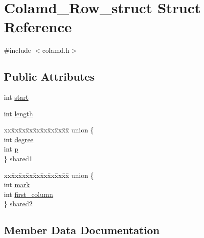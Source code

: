 \hypertarget{structColamd__Row__struct}{}\section{Colamd\+\_\+\+Row\+\_\+struct Struct Reference}
\label{structColamd__Row__struct}


{\ttfamily \#include $<$colamd.\+h$>$}

\subsection*{Public Attributes}
\begin{DoxyCompactItemize}
\item 
int \hyperlink{structColamd__Row__struct_a24285056395b1cf2e28ea3810d67d09d}{start}
\item 
int \hyperlink{structColamd__Row__struct_a4cf6076c6aeab980aa2add1c24913c35}{length}
\item 
\begin{tabbing}
xx\=xx\=xx\=xx\=xx\=xx\=xx\=xx\=xx\=\kill
union \{\\
\>int \hyperlink{structColamd__Row__struct_a01e336d70f1cbe2ac615d4b23c480ecd}{degree}\\
\>int \hyperlink{structColamd__Row__struct_acb0d165350cbbdad8dc4260bd48b1f80}{p}\\
\} \hyperlink{structColamd__Row__struct_a9f8a228dc157733ece95870aa59b14c0}{shared1}\\

\end{tabbing}\item 
\begin{tabbing}
xx\=xx\=xx\=xx\=xx\=xx\=xx\=xx\=xx\=\kill
union \{\\
\>int \hyperlink{structColamd__Row__struct_a00b8bd69ce2b84d9b75c5503d80c5080}{mark}\\
\>int \hyperlink{structColamd__Row__struct_af7bf4c87b04e63e6b1abc2c86e8d1376}{first\_column}\\
\} \hyperlink{structColamd__Row__struct_a3493ff232ba69ec8bc78dc697901a2ce}{shared2}\\

\end{tabbing}\end{DoxyCompactItemize}


\subsection{Member Data Documentation}
\hypertarget{structColamd__Row__struct_a01e336d70f1cbe2ac615d4b23c480ecd}{}
